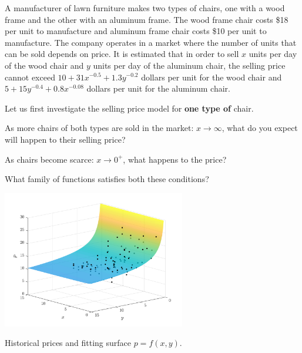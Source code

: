 \documentclass{workbook}
\begin{document}
\begin{slide}

\question 

\begin{problem}%
	A manufacturer of lawn furniture makes two types of chairs, one with a wood frame and the other with an aluminum frame. The wood frame chair costs \$18 per unit to manufacture and aluminum frame chair costs \$10 per unit to manufacture. The company operates in a market where the number of units that can be sold depends on price. It is estimated that in order to sell $x$ units per day of the wood chair and $y$ units per day of the aluminum chair, the selling price cannot exceed $10 + 31x^{-0.5} + 1.3y^{-0.2}$ dollars per unit for the wood chair and $5 + 15y^{-0.4} + 0.8x^{-0.08}$ dollars per unit for the aluminum chair.
\end{problem}


Let us first investigate the selling price model for \textbf{one type of} chair. %

\begin{parts}
	\item As more chairs of both types are sold in the market: $x \to \infty$, what do you expect will happen to their selling price?
	
	
	\item As chairs become scarce: $x \to 0^+$, what happens to the price?
	
	
	\item What family of functions satisfies both these conditions?
	
	
\end{parts}
 

	
\end{slide}


\begin{slide}

\begin{center}
\includegraphics[width=0.6\textwidth]{images/fitprice.png}

Historical prices and fitting surface $p=f(x,y)$.
\end{center}

\end{slide}
\end{document}
